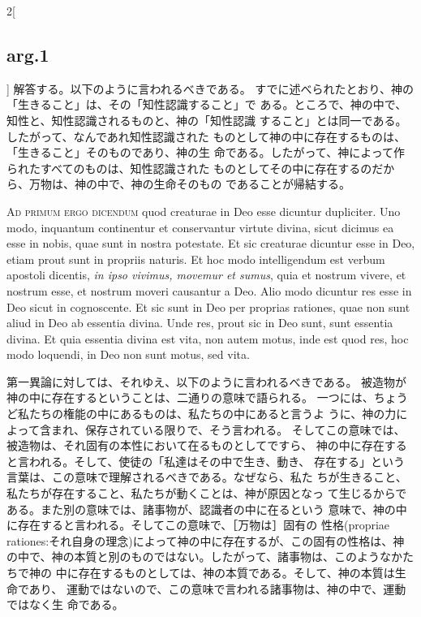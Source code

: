 \documentclass[paper=a4paper,fontsize=10pt,jafontsize=9pt,titlepage]{jlreq}
\begin{document}
\begin{paracol}{2}[\subsection{arg.1}]
解答する。以下のように言われるべきである。
すでに述べられたとおり、神の「生きること」は、その「知性認識すること」で
 ある。ところで、神の中で、知性と、知性認識されるものと、神の「知性認識
 すること」とは同一である。したがって、なんであれ知性認識された
 ものとして神の中に存在するものは、「生きること」そのものであり、神の生
 命である。したがって、神によって作られたすべてのものは、知性認識された
 ものとしてその中に存在するのだから、万物は、神の中で、神の生命そのもの
 であることが帰結する。

\switchcolumn*[\subsection{ad.1}]


{\scshape Ad primum ergo dicendum} quod creaturae in Deo
 esse dicuntur dupliciter. Uno modo, inquantum continentur et
 conservantur virtute divina, sicut dicimus ea esse in nobis, quae sunt
 in nostra potestate. Et sic creaturae dicuntur esse in Deo, etiam prout
 sunt in propriis naturis. Et hoc modo intelligendum est verbum apostoli
 dicentis, {\itshape in ipso vivimus, movemur et sumus}, quia et nostrum vivere, et
 nostrum esse, et nostrum moveri causantur a Deo. Alio modo dicuntur res
 esse in Deo sicut in cognoscente. Et sic sunt in Deo per proprias
 rationes, quae non sunt aliud in Deo ab essentia divina. Unde res,
 prout sic in Deo sunt, sunt essentia divina. Et quia essentia divina
 est vita, non autem motus, inde est quod res, hoc modo loquendi, in Deo
 non sunt motus, sed vita.

\switchcolumn

第一異論に対しては、それゆえ、以下のように言われるべきである。
被造物が神の中に存在するということは、二通りの意味で語られる。
一つには、ちょうど私たちの権能の中にあるものは、私たちの中にあると言うよ
 うに、神の力によって含まれ、保存されている限りで、そう言われる。
そしてこの意味では、被造物は、それ固有の本性において在るものとしてですら、
 神の中に存在すると言われる。そして、使徒の「私達はその中で生き、動き、
 存在する」という言葉は、この意味で理解されるべきである。なぜなら、私た
 ちが生きること、私たちが存在すること、私たちが動くことは、神が原因となっ
 て生じるからである。また別の意味では、諸事物が、認識者の中に在るという
 意味で、神の中に存在すると言われる。そしてこの意味で、［万物は］固有の
 性格(propriae rationes:それ自身の理念)によって神の中に存在するが、この固有の性格は、神
 の中で、神の本質と別のものではない。したがって、諸事物は、このようなかたちで神の
 中に存在するものとしては、神の本質である。そして、神の本質は生命であり、
 運動ではないので、この意味で言われる諸事物は、神の中で、運動ではなく生
 命である。


\end{paracol}
\end{document}

